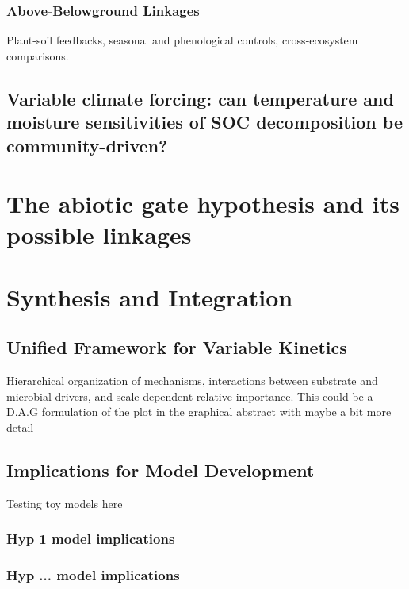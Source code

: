 \documentclass[12pt,a4paper]{article}
\begin{document}
\subsubsection{Above-Belowground Linkages} \label{sec:microbial_linkages}

Plant-soil feedbacks, seasonal and phenological controls, cross-ecosystem comparisons.


\subsection{Variable climate forcing: can temperature and moisture sensitivities of SOC decomposition be community-driven?} \label{sec:variable_forcing}


\section{The abiotic gate hypothesis and its possible linkages}


\section{Synthesis and Integration} \label{sec:synthesis}

\subsection{Unified Framework for Variable Kinetics} \label{sec:synthesis_framework}

Hierarchical organization of mechanisms, interactions between substrate and microbial drivers, and scale-dependent relative importance.
This could be a D.A.G formulation of the plot in the graphical abstract with maybe a bit more detail


\subsection{Implications for Model Development} \label{sec:synthesis_models}

Testing toy models here

\subsubsection{ Hyp 1 model implications}

\subsubsection{ Hyp ... model implications}
\end{document}
